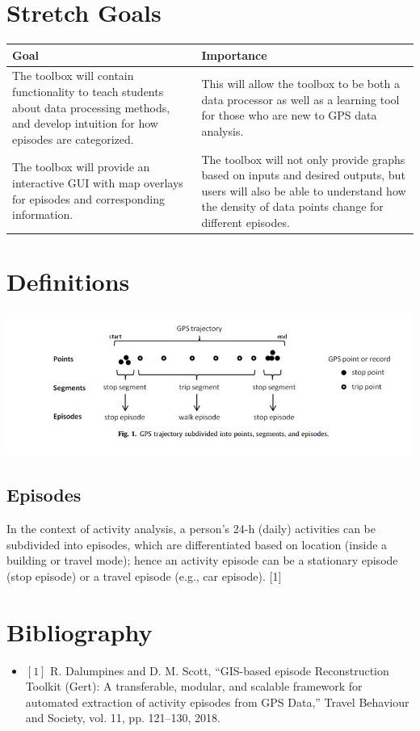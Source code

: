 \documentclass{article}
\begin{document}
\section{Stretch Goals}

\begin{tabular}{|p{6cm}|p{6cm}|}
    		\hline
    		\textbf{Goal} & \textbf{Importance} \\
    		\hline
    		The toolbox will contain functionality to teach students about data processing methods, and develop intuition for how episodes are categorized. & This will allow the toolbox to be both a data processor as well as a learning tool for those who are new to GPS data analysis.  \\
    		\hline
    		The toolbox will provide an interactive GUI with map overlays for episodes and corresponding information. & The toolbox will not only provide graphs based on inputs and desired outputs, but users will also be able to understand how the density of data points change for different episodes.  \\
    		\hline
\end{tabular}
\section{Definitions}
\includegraphics[scale=0.6]{./gert.jpg}
\subsection{Episodes}
In the context of activity analysis, a person’s 24-h (daily) activities can be subdivided into episodes, which are differentiated
based on location (inside a building or travel mode); hence an
activity episode can be a stationary episode (stop episode) or a travel episode (e.g., car episode). [1]

\section{Bibliography}
\begin{itemize}
    \item $[1]$ R. Dalumpines and D. M. Scott, “GIS-based episode Reconstruction Toolkit (Gert): A transferable, modular, and scalable framework for automated extraction of activity episodes from GPS Data,” Travel Behaviour and Society, vol. 11, pp. 121–130, 2018. 
\end{itemize}
 
\end{document}
